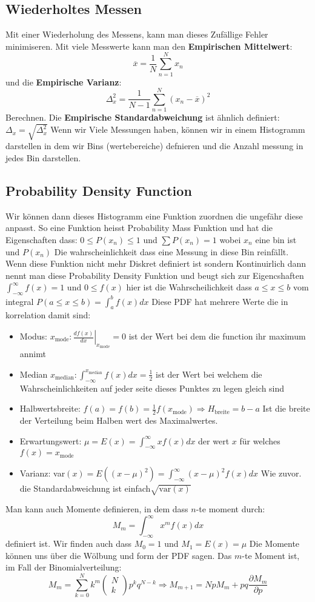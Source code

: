 \documentclass{article}
\begin{document}
\hypertarget{PDF}{\subsection*{Wiederholtes Messen}}
Mit einer Wiederholung des Messens, kann man dieses Zufällige Fehler minimiseren. Mit viele Messwerte kann man den \textbf{Empirischen Mittelwert}:
\[\overline{x}=\frac{1}{N}\sum_{n=1}^N x_n\] und die \textbf{Empirische Varianz}:\[\Delta_x^2=\frac{1}{N-1}\sum_{n=1}^N(x_n-\overline{x})^2\]Berechnen. Die \textbf{Empirische Standardabweichung} ist ähnlich definiert: $\Delta_x=\sqrt{\Delta_x^2}$
\newline Wenn wir Viele Messungen haben, können wir in einem Histogramm darstellen in dem wir Bins (wertebereiche) defnieren und die Anzahl messung in jedes Bin darstellen.
\subsection*{Probability Density Function}
Wir können dann dieses Histogramm eine Funktion zuordnen die ungefähr diese anpasst. So eine Funktion heisst Probability Mass Funktion und hat die Eigenschaften dass: $0\le P(x_n)\le 1$ und $\sum P(x_n)=1$ wobei $x_n$ eine bin ist und $P(x_n)$ Die wahrscheinlichkeit dass eine Messung in diese Bin reinfällt.
Wenn diese Funktion nicht mehr Diskret definiert ist sondern Kontinuirlich dann nennt man diese Probability Density Funktion und beugt sich zur Eigencshaften $\int_{-\infty}^\infty f(x)=1$ und $0\le f(x)$ hier ist die Wahrscheilichkeit dass $a\le x\le b$ vom integral $P(a\le x\le b)=\int_a^b f(x) dx$
Diese PDF hat mehrere Werte die in korrelation damit sind:
\begin{itemize}
  \item{Modus: $x_\text{mode}:\left.\frac{df(x)}{dx}\right|_{x_\text{mode}}=0$  ist der Wert bei dem die function ihr maximum annimt}
  \item{Median $x_\text{median}:\int_{-\infty}^{x_\text{median}}f(x)dx=\frac{1}{2}$ ist der Wert bei welchem die Wahrscheinlichkeiten auf jeder seite dieses Punktes zu legen gleich sind}
  \item{Halbwertsbreite: $f(a)=f(b)=\frac{1}{2}f(x_\text{mode})\Longrightarrow H_\text{breite}=b-a$ Ist die breite der Verteilung beim Halben wert des Maximalwertes.}
  \item{Erwartungswert: $\mu=E(x)=\int_{-\infty}^\infty xf(x)dx$ der wert $x$ für welches $f(x)=x_\text{mode}$}
  \item{Varianz: var$(x)=E((x-\mu)^2)=\int_{-\infty}^\infty(x-\mu)^2f(x)dx$ Wie zuvor. die Standardabweichung ist einfach$\sqrt{\text{var}(x)}$}
\end{itemize}
Man kann auch Momente definieren, in dem dass $n$-te moment durch:\[M_m=\int_{-\infty}^\infty x^mf(x)dx\] definiert ist. Wir finden auch dass $M_0=1$ und $M_1=E(x)=\mu$
Die Momente können uns über die Wölbung und form der PDF sagen.
\newline Das $m$-te Moment ist, im Fall der Binomialverteilung:\[M_m=\sum_{k=0}^Nk^m\begin{pmatrix}N\\k\end{pmatrix}p^kq^{N-k}\Longrightarrow M_{m+1}=NpM_m+pq\frac{\partial M_m}{\partial p}\]
\end{document}
